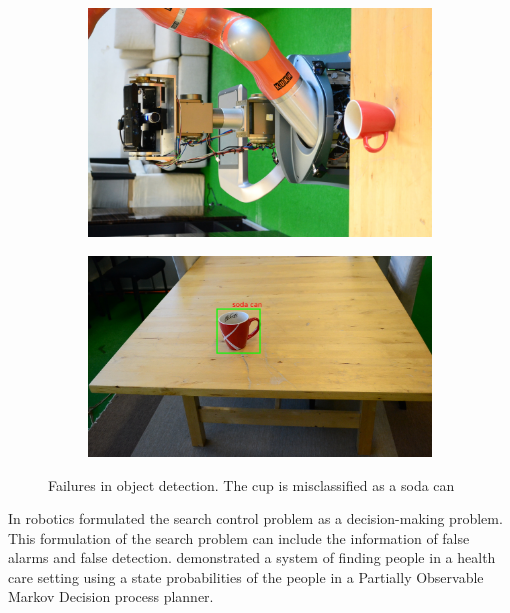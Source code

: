 \begin{figure}[htp]
\centering
\begin{subfigure}{.4\textwidth}
  \centering
  \includegraphics[width=0.9\linewidth, angle=-90]{images/robot_looking_cup.jpg}
\end{subfigure}%
\begin{subfigure}{.6\textwidth}
  \centering
  \includegraphics[width=\linewidth]{images/robot_view_cup.jpg}
\end{subfigure}
\caption[Fault tolerant search example]{Failures in object detection. The cup is misclassified as a soda can}
\end{figure}

In robotics \cite{chung2007decision} formulated the search control problem as a decision-making problem. This formulation of the search problem can include the information of false alarms and false detection. \cite{roy2003planning} demonstrated a system of finding people in a health care setting using a state probabilities of the people in a Partially Observable Markov Decision process planner. 

